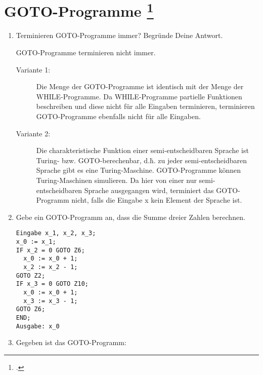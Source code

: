 \documentclass{bschlangaul-aufgabe}
\begin{document}
\section{GOTO-Programme
\footcite[Aufgabe 4]{theo:ab:4}}

\begin{enumerate}


\item Terminieren GOTO-Programme immer? Begründe Deine Antwort.

\begin{liAntwort}
GOTO-Programme terminieren nicht immer.

\begin{description}
\item[Variante 1:]

Die Menge der GOTO-Programme ist identisch mit der Menge der
WHILE-Programme. Da WHILE-Programme partielle Funktionen beschreiben und
diese nicht für alle Eingaben terminieren, terminieren GOTO-Programme
ebenfalls nicht für alle Eingaben.

\item[Variante 2:]

Die charakteristische Funktion einer semi-entscheidbaren Sprache ist
Turing- bzw. GOTO-berechenbar, d.\.h. zu jeder semi-entscheidbaren
Sprache gibt es eine Turing-Maschine. GOTO-Programme können
Turing-Maschinen simulieren. Da hier von einer nur semi-entscheidbaren
Sprache ausgegangen wird, terminiert das GOTO-Programm nicht, falls die
Eingabe x kein Element der Sprache ist.
\end{description}
\end{liAntwort}


\item Gebe ein GOTO-Programm an, dass die Summe dreier Zahlen berechnen.

\begin{liAntwort}
\begin{verbatim}
Eingabe x_1, x_2, x_3;
x_0 := x_1;
IF x_2 = 0 GOTO Z6;
  x_0 := x_0 + 1;
  x_2 := x_2 - 1;
GOTO Z2;
IF x_3 = 0 GOTO Z10;
  x_0 := x_0 + 1;
  x_3 := x_3 - 1;
GOTO Z6;
END;
Ausgabe: x_0
\end{verbatim}
\end{liAntwort}


\item Gegeben ist das GOTO-Programm:


\end{enumerate}
\end{document}
